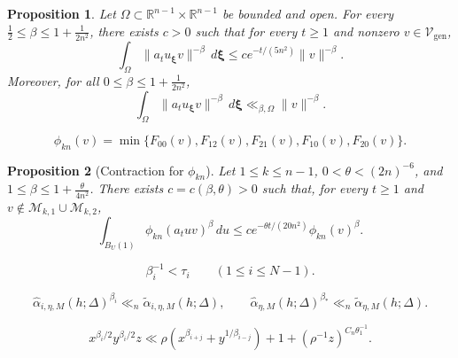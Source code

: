 \documentclass[10pt,a4paper]{amsart}
\newtheorem{proposition}{Proposition}
\newcommand{\op}{\operatorname}
\begin{document}
\begin{proposition}
\label{lem:localcontractioninequalitygenerali}
\label{cor:generalweightedcontractiontensor}
Let $\Omega\subset\mathbb R^{n-1}\times\mathbb R^{n-1}$ be bounded and
open. For every
$\frac12\le\beta\le1+\frac1{2n^2}$, there exists $c>0$ such that
for every $t\ge1$ and nonzero $v\in\mathcal V_{\op{gen}}$, \begin{equation}
\label{eq:contractioninequalityatleasthalf}
\int_\Omega\|a_tu_{\boldsymbol{\xi}} v\|^{-\beta}\,d\boldsymbol{\xi}
\le c e^{-t/(5n^2)}\|v\|^{-\beta}.
\end{equation}
 Moreover, for all
$0\le\beta\le1+\frac1{2n^2}$,
\begin{equation}
\label{eq:contractioninequalitysmallrange}
\int_\Omega\|a_tu_{\boldsymbol{\xi}} v\|^{-\beta}\,d\boldsymbol{\xi}
\ll_{\beta,\Omega}\|v\|^{-\beta}.
\end{equation}
\end{proposition}

\begin{equation}
\label{eq:phi-as-minimum}
\phi_{kn}(v)
=
\min\{F_{00}(v),F_{12}(v),F_{21}(v),F_{10}(v),F_{20}(v)\}.
\end{equation}

\begin{proposition}[Contraction for $\phi_{kn}$]
\label{prop:localMargulisineq;n-1}
Let $1\le k\le n-1$, $0<\theta<(2n)^{-6}$, and
$1\le\beta\le1+\frac{\theta}{4n^2}$.
There exists $c=c(\beta,\theta)>0$ such that, for every
$t\ge1$ and 
$v\notin\mathcal M_{k,1}\cup\mathcal M_{k,2}$,
$$
\int_{B_{U}(1)}\phi_{kn}(a_tuv)^\beta\,du
\le c e^{-\theta t/(20n^2)}\phi_{kn}(v)^\beta.
$$
\end{proposition}

\begin{equation}\label{eq:beta-tau-comparison}
\beta_i^{-1}<\tau_i
\qquad (1\le i\le N-1).
\end{equation}

\begin{equation}\label{eq:sharp-majorized-by-tilde}
\widehat{\alpha}_{i,\eta,M}(h;\Delta)^{\beta_i}
\ll_n \widetilde\alpha_{i,\eta,M}(h;\Delta),
\qquad
\widehat{\alpha}_{\eta,M}(h;\Delta)^{\beta_*}
\ll_n \widetilde\alpha_{\eta,M}(h;\Delta).
\end{equation}

\begin{equation}\label{eq:Youngineq}
x^{\beta_i/2}y^{\beta_i/2}z
\ll
\rho\left(x^{\beta_{i+j}}+y^{1/\beta_{i-j}}\right)
+
1+\left(\rho^{-1}z\right)^{C_n\theta_1^{-1}}.
\end{equation}
\end{document}
